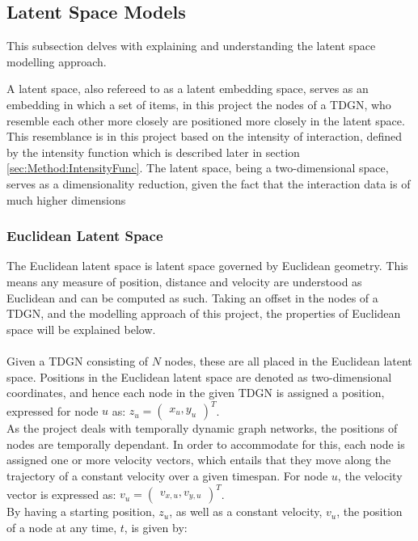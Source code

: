 \subsection{Latent Space Models}
\label{sec:Method:LSM}
This subsection delves with explaining and understanding the latent space modelling approach.

A latent space, also refereed to as a latent embedding space, serves as an embedding in which a set of items, in this project the nodes of a TDGN, who resemble each other more closely are positioned more closely in the latent space.
This resemblance is in this project based on the intensity of interaction, defined by the intensity function which is described later in section \ref{sec:Method:IntensityFunc}.
The latent space, being a two-dimensional space, serves as a dimensionality reduction, given the fact that the interaction data is of much higher dimensions


\subsubsection{Euclidean Latent Space}
\label{sec:Method:LSM:EuclideanLatentSpace}
The Euclidean latent space is latent space governed by Euclidean geometry.
This means any measure of position, distance and velocity are understood as Euclidean and can be computed as such. 
Taking an offset in the nodes of a TDGN, and the modelling approach of this project, the properties of Euclidean space will be explained below.
\\\\
Given a TDGN consisting of $N$ nodes, these are all placed in the Euclidean latent space. 
Positions in the Euclidean latent space are denoted as two-dimensional coordinates, and hence each node in the given TDGN is assigned a position, expressed for node $u$ as:
$z_u = \begin{pmatrix}
x_u, y_u
\end{pmatrix}^T$.
\\
As the project deals with temporally dynamic graph networks, the positions of nodes are temporally dependant. 
In order to accommodate for this, each node is assigned one or more velocity vectors, which entails that they move along the trajectory of a constant velocity over a given timespan.
For node $u$, the velocity vector is expressed as:
$v_u = \begin{pmatrix}
v_{x,u}, v_{y,u}
\end{pmatrix}^T$.
\\
By having a starting position, $z_u$, as well as a constant velocity, $v_u$, the position of a node at any time, $t$, is given by: 

